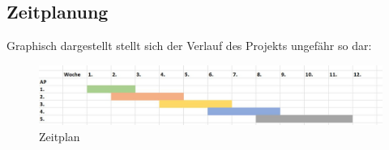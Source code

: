 \subsection{Zeitplanung}

Graphisch dargestellt stellt sich der Verlauf des Projekts ungefähr so dar:

\begin{figure}[h]
	\begin{center}
		\includegraphics[scale=0.5]{Zeitplan_graphisch.jpg}
		\caption{Zeitplan}
	\end{center}
\end{figure}


















